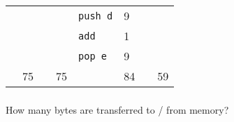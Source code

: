 \documentclass{article}
\begin{document}
\begin{tabular}{l|ll|ll|ll|l|}
\multicolumn{1}{|l|}{} & & \multicolumn{1}{|l|}{} & & \multicolumn{1}{|l|}{\texttt{push d}} & 9 & \multicolumn{1}{|l|}{} & \\ 
\multicolumn{1}{|l|}{} & & \multicolumn{1}{|l|}{} & & \multicolumn{1}{|l|}{\texttt{add}} & 1 & \multicolumn{1}{|l|}{} &\\
\multicolumn{1}{|l|}{} & & \multicolumn{1}{|l|}{} & & \multicolumn{1}{|l|}{\texttt{pop e}} & 9 & \multicolumn{1}{|l|}{} &\\
\hline
 & \multicolumn{1}{|l|}{75} & & \multicolumn{1}{|l|}{75} & & \multicolumn{1}{|l|}{84} & & \multicolumn{1}{|l|}{59} \\
 \cline{2-2}\cline{4-4}\cline{6-6}\cline{8-8}
\end{tabular}
\subsubsection{} 
How many bytes are transferred to / from memory?\\
\end{document}
